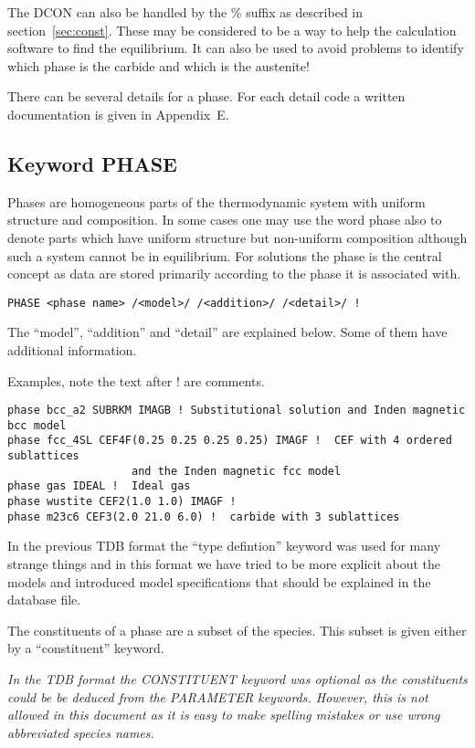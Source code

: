 \documentclass[12pt]{article}
\begin{document}
The DCON can also be handled by the \% suffix as described in
section~\ref{sec:const}.  These may be considered to be a way to help
the calculation software to find the equilibrium.  It can also be used
to avoid problems to identify which phase is the carbide and which is
the austenite!

There can be several details for a phase.  For each detail code a
written documentation is given in Appendix~E.

\subsection{Keyword PHASE}

Phases are homogeneous parts of the thermodynamic system with uniform
structure and composition.  In some cases one may use the word phase
also to denote parts which have uniform structure but non-uniform
composition although such a system cannot be in equilibrium.  For
solutions the phase is the central concept as data are stored
primarily according to the phase it is associated with.

\begin{verbatim}
PHASE <phase name> /<model>/ /<addition>/ /<detail>/ !
\end{verbatim}

The ``model'', ``addition'' and ``detail'' are explained below.  Some
of them have additional information.

Examples, note the text after ! are comments.

\begin{verbatim}
phase bcc_a2 SUBRKM IMAGB ! Substitutional solution and Inden magnetic bcc model
phase fcc_4SL CEF4F(0.25 0.25 0.25 0.25) IMAGF !  CEF with 4 ordered sublattices
                   and the Inden magnetic fcc model
phase gas IDEAL !  Ideal gas
phase wustite CEF2(1.0 1.0) IMAGF ! 
phase m23c6 CEF3(2.0 21.0 6.0) !  carbide with 3 sublattices
\end{verbatim}

In the previous TDB format the ``type defintion'' keyword was used for
many strange things and in this format we have tried to be more
explicit about the models and introduced model specifications that
should be explained in the database file.

The constituents of a phase are a subset of the species.  This subset
is given either by a ``constituent'' keyword.

{\em In the TDB format the CONSTITUENT keyword was optional as the
  constituents could be be deduced from the PARAMETER keywords.
  However, this is not allowed in this document as it is easy to make
  spelling mistakes or use wrong abbreviated species names.}
\end{document}
